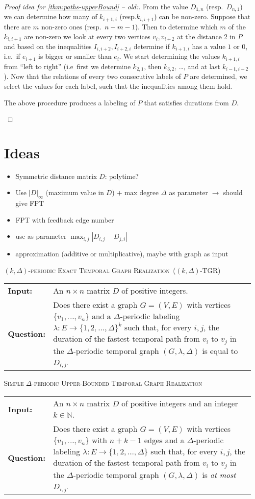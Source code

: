 \documentclass[a4paper,UKenglish,cleveref, autoref, thm-restate]{lipics-v2021}
\makeatletter
\newcommand{\problemdef}[3]{
	\begin{center}
		\begin{minipage}{0.95\textwidth}
			\noindent
			#1
			\vspace{5pt}\\
			\setlength{\tabcolsep}{3pt}
			\begin{tabularx}{\textwidth}{@{}lX@{}}
				\textbf{Input:}& #2 \\
				\textbf{Question:}& #3
			\end{tabularx}
		\end{minipage}
	\end{center}
}
\newcommand{\kDeltaExactLong}{\textsc{$(k,\Delta)$-periodic Exact Temporal Graph Realization}}
\newcommand{\kDeltaExact}{\textsc{$(k,\Delta)$-TGR}}
\newcommand{\DeltaUpperBoundLong}{\textsc{Simple $\Delta$-periodic Upper-Bounded Temporal Graph Realization}}
\makeatother
\begin{document}
\begin{proof}[Proof idea for \cref{thm:paths-upperBound} -- old:]
	From the value $D_{1,n}$ (resp.~$D_{n,1}$) we can determine how many of $k_{i+1,i}$ (resp.$k_{i,i+1}$) can be non-zero. Suppose that there are $m$ non-zero ones (resp.~$n-m-1$).
	Then to determine which $m$ of the $k_{i,i+1}$ are non-zero we look at every two vertices $v_i, v_{i+2}$ at the distance $2$ in $P$ 
	and based on the inequalities $I_{i,i+2}, I_{i+2,i}$ determine if $k_{i+1,i}$ has a value $1$ or $0$,
	i.e.~if $e_{i+1}$ is bigger or smaller than $e_i$.
	We start determining the values $k_{i+1,i}$ from ``left to right'' (i.e~first we determine $k_{2,1}$, then $k_{3,2}$, \dots, and at last $k_{i-1,i-2}$).
	Now that the relations of every two consecutive labels of $P$ are determined, 
	we select the values for each label, such that the inequalities among them hold.
	\begin{claim}
		The above procedure produces a labeling of $P$ that satisfies durations from $D$.
	\end{claim}
\end{proof}
	
	
\clearpage

\section{Ideas}
\begin{itemize}
    \item Symmetric distance matrix $D$: polytime?
    \item Use $|D|_\infty$ (maximum value in $D$) + max degree $\Delta$ as parameter $\rightarrow$ should give FPT
    \item FPT with feedback edge number
    \item use as parameter $\max_{i,j} |D_{i,j}-D_{j,i}|$
    \item approximation (additive or multiplicative), maybe with graph as input
\end{itemize}

\problemdef{\kDeltaExactLong\ (\kDeltaExact)}
{An $n \times n$ matrix $D$ of positive integers.}
{Does there exist a graph $G=(V,E)$ with vertices $\{v_1,\ldots,v_{n}\}$ 
and a $\Delta$-periodic labeling $\lambda: E \rightarrow \{1,2,\ldots,\Delta\}^k$ such that, 
for every $i,j$, the duration of the fastest temporal path from $v_i$ to $v_j$ in the $\Delta$-periodic temporal graph $(G,\lambda,\Delta)$ is equal to $D_{i,j}$.}

\problemdef{\DeltaUpperBoundLong}
{An $n \times n$ matrix $D$ of positive integers and an integer $k\in \mathbb{N}$.}
{Does there exist a graph $G=(V,E)$ with vertices $\{v_1,\ldots,v_{n}\}$ with $n+k-1$ edges 
	and a $\Delta$-periodic labeling $\lambda: E \rightarrow \{1,2,\ldots,\Delta\}$ such that, 
	for every $i,j$, the duration of the fastest temporal path from $v_i$ to $v_j$ in the $\Delta$-periodic temporal graph $(G,\lambda,\Delta)$ is \emph{at most} $D_{i,j}$.}
\end{document}
